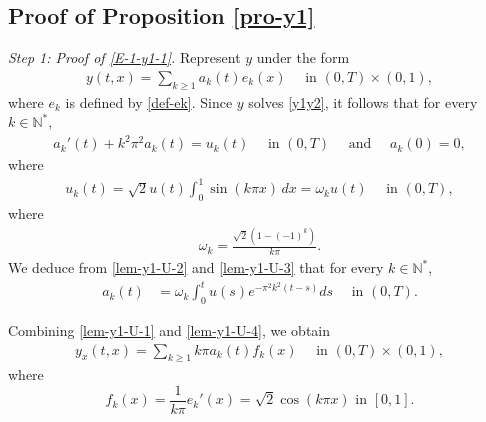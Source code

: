 \documentclass[11pt, reqno]{amsart}
\theoremstyle{plain}
\numberwithin{equation}{section}
\newcommand{\mN}{\mathbb{N}}
\begin{document}
\subsection{Proof of Proposition \ref{pro-y1}}	\label{subsec-proofproy1}
\textit{Step 1: Proof of \eqref{E-1-y1-1}.}  Represent  $y$ under the form
\begin{align}	\label{lem-y1-U-1}
y(t, x) = \sum_{k \ge 1}a_k (t) e_k(x) \quad \mbox{ in } (0, T) \times (0,1),  
\end{align}
where $e_k$ is defined by \eqref{def-ek}.  Since $y$ solves \eqref{y1y2}, it follows that for every $k \in \mN^*$,
\begin{align}	\label{lem-y1-U-2}
a_k'(t) +   k^2 \pi^2 a_k(t) = u_k (t) \quad \text{ in } (0, T) \quad \mbox{ and } \quad  a_k (0) = 0,
\end{align}
where
\begin{align}	\label{lem-y1-U-3}
u_k (t) = \sqrt{2}  u(t) \int_0^1 \sin (k \pi x ) \, dx = \omega_k u(t) \quad \text{ in } (0, T),
\end{align}
where
\begin{align} \label{lem-y1-wk}
\omega_k = \frac{\sqrt{2} \left( 1 - (-1)^k \right)}{k \pi}.  
\end{align}
We deduce from \eqref{lem-y1-U-2} and \eqref{lem-y1-U-3} that for every $k \in \mN^*$, 
\begin{align}	\label{lem-y1-U-4}
a_k(t) &=  \omega_k \int_0^t u(s) e^{-  \pi^2 k^2 (t - s)} ds \quad \text{ in } (0, T).
\end{align}

Combining  \eqref{lem-y1-U-1} and \eqref{lem-y1-U-4}, we obtain 
\begin{align}	\label{lem-y1x-U-1}
y_{x}(t, x) = \sum_{k \ge 1} k \pi a_k (t) f_k(x) \quad \mbox{ in } (0, T) \times (0,1), 
\end{align}
where 
$$
f_k(x) = \frac{1}{k \pi} e_k'(x) = \sqrt{2} \cos (k \pi x) \mbox{ in } [0, 1]. 
$$
\end{document}
